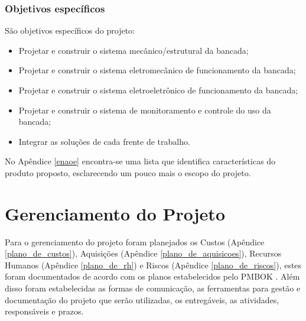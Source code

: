    \subsection{Objetivos específicos}
       São objetivos específicos do projeto:
       \begin{itemize}
        
        \item Projetar e construir o sistema mecânico/estrutural da bancada;
        \item Projetar e construir o sistema eletromecânico de funcionamento da bancada;
        \item Projetar e construir o sistema eletroeletrônico de funcionamento da bancada;
        \item Projetar e construir o sistema de monitoramento e controle do uso da bancada;
        \item Integrar as soluções de cada frente de trabalho.
       \end{itemize}
       
       No Apêndice \ref{enaoe} encontra-se uma lista que identifica características do produto proposto, esclarecendo um pouco mais o escopo do projeto.
       
% 

\chapter{Gerenciamento do Projeto}

Para o gerenciamento do projeto foram planejados os Custos (Apêndice \ref{plano_de_custos}), Aquisições (Apêndice \ref{plano_de_aquisicoes}), Recursos Humanos (Apêndice \ref{plano_de_rh}) e Riscos (Apêndice \ref{plano_de_riscos}), estes foram documentados de acordo com os planos estabelecidos pelo PMBOK \cite{pmbok}.
Além disso foram estabelecidas as formas de comunicação, as ferramentas para gestão e documentação do projeto que serão utilizadas, os entregáveis, as atividades, responsáveis e prazos.  

